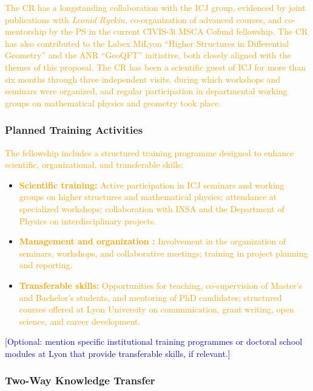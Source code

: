 \documentclass[11pt,draftproposal]{msca-pf}
\begin{document}
\textcolor{orange}{The CR has a longstanding collaboration with the ICJ group, evidenced by joint publications with \emph{Leonid Ryvkin}, co-organization of advanced courses, and co-mentorship by the PS in the current CIVIS-3i MSCA Cofund fellowship. The CR has also contributed to the Labex MiLyon “Higher Structures in Differential Geometry” and the ANR “GeoQFT” initiative, both closely aligned with the themes of this proposal. The CR has been a scientific guest of ICJ for more than six months through three independent visits, during which workshops and seminars were organized, and regular participation in departmental working groups on mathematical physics and geometry took place.}  

\subsubsection*{Planned Training Activities}

\textcolor{orange}{The fellowship includes a structured training programme designed to enhance scientific, organizational, and transferable skills:}

\begin{itemize}[noitemsep,topsep=0pt]
    \item \textbf{\textcolor{orange}{Scientific training:}} \textcolor{orange}{Active participation in ICJ seminars and working groups on higher structures and mathematical physics; attendance at specialized workshops; collaboration with INSA and the Department of Physics on interdisciplinary projects.}
    \item \textbf{\textcolor{orange}{Management and organization :}} \textcolor{orange}{Involvement in the organization of seminars, workshops, and collaborative meetings; training in project planning and reporting.}
    \item \textbf{\textcolor{orange}{Transferable skills:}} \textcolor{orange}{Opportunities for teaching, co-supervision of Master’s and Bachelor’s students, and mentoring of PhD candidates; structured courses offered at Lyon University on communication, grant writing, open science, and career development.}
\end{itemize}

\textcolor{blue}{[Optional: mention specific institutional training programmes or doctoral school modules at Lyon that provide transferable skills, if relevant.]}  

\subsubsection*{Two-Way Knowledge Transfer}
\end{document}
